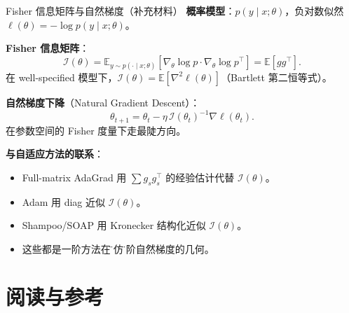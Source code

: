 \documentclass[aspectratio=169,10pt]{ctexbeamer}
\newcommand{\E}{\mathbb{E}}
\newcommand{\grad}{\nabla}
\begin{document}
\begin{frame}{Fisher 信息矩阵与自然梯度（补充材料）}
\textbf{概率模型}：$p(y\mid x;\theta)$，负对数似然 $\ell(\theta)=-\log p(y\mid x;\theta)$。

\vspace{.2cm}
\textbf{Fisher 信息矩阵}：
\[
  \mathcal{I}(\theta)=\E_{y\sim p(\cdot\mid x;\theta)}\!\left[\grad_\theta\log p\cdot\grad_\theta\log p^\top\right]
                    =\E[g g^\top].
\]
在 well-specified 模型下，$\mathcal{I}(\theta)=\E[\grad^2\ell(\theta)]$（Bartlett 第二恒等式）。

\vspace{.2cm}
\textbf{自然梯度下降}（Natural Gradient Descent）：
\[
  \theta_{t+1}=\theta_t-\eta\,\mathcal{I}(\theta_t)^{-1}\grad\ell(\theta_t).
\]
在参数空间的 Fisher 度量下走最陡方向。

\vspace{.2cm}
\textbf{与自适应方法的联系}：
\begin{itemize}
  \item Full-matrix AdaGrad 用 $\sum g_s g_s^\top$ 的经验估计代替 $\mathcal{I}(\theta)$。
  \item Adam 用 diag 近似 $\mathcal{I}(\theta)$。
  \item Shampoo/SOAP 用 Kronecker 结构化近似 $\mathcal{I}(\theta)$。
  \item 这些都是一阶方法在\"模仿\"二阶自然梯度的几何。
\end{itemize}
\end{frame}

\section{阅读与参考}
\end{document}
